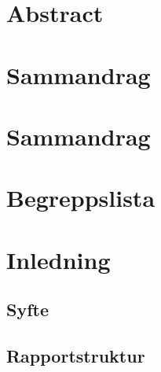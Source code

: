 \documentclass[12pt,a4paper,twoside,openright]{report}
\begin{document}


\newpage\null{} %
\newpage


\newpage
{} %
\setcounter{page}{3}

\chapter*{Abstract}

\newpage

\chapter*{Sammandrag}

\newpage

\chapter*{Sammandrag}

\newpage

\tableofcontents
\newpage

\chapter*{Begreppslista}


\newpage


\chapter{Inledning}\label{chap:inledning}

% 
% 
\section{Syfte}

\section{Rapportstruktur}

\end{document}
